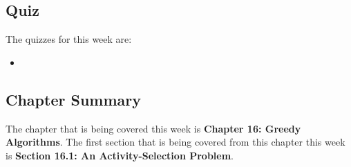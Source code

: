 \subsection{Quiz}

The quizzes for this week are:

\begin{itemize}
    \item {} \textbullet {} 
\end{itemize}

\subsection{Chapter Summary}

The chapter that is being covered this week is \textbf{Chapter 16: Greedy Algorithms}. The first section that is being covered from this chapter this week is \textbf{Section 16.1: An Activity-Selection Problem}.


